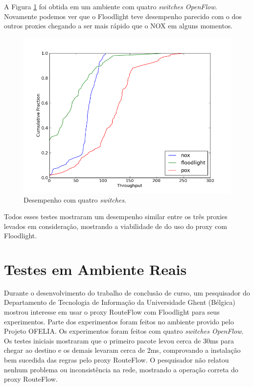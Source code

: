 A Figura \ref{fig:desempenho4sw} foi obtida em um ambiente
com quatro \textit{switches OpenFlow}. Novamente podemos
ver que o Floodlight teve desempenho parecido com o dos
outros proxies chegando a ser mais rápido que o NOX em 
alguns momentos.


\begin{figure}[h]
\centering
\includegraphics[width=140mm]{desempenho_4sw.png}
\caption{Desempenho com quatro \textit{switches}.}
\label{fig:desempenho4sw} 
\end{figure}

Todos esses testes mostraram um desempenho similar entre
os três proxies levados em consideração, mostrando a viabilidade
de do uso do proxy com Floodlight.

\section{Testes em Ambiente Reais}

Durante o desenvolvimento do trabalho de conclusão de
curso, um pesquisador do Departamento de Tecnologia de
Informação da Universidade Ghent (Bélgica) mostrou interesse
em usar o proxy RouteFlow com Floodlight para seus
experimentos. Parte dos experimentos foram feitos no ambiente
provido pelo Projeto OFELIA. Os experimentos
foram feitos com quatro \textit{switches OpenFlow}. Os testes
iniciais mostraram que o primeiro pacote levou cerca de 30ms
para chegar ao destino e os demais levaram cerca de
2ms, comprovando a instalação bem sucedida das regras pelo
proxy RouteFlow. O pesquisador não relatou nenhum 
problema ou inconsistência na rede, mostrando a operação
correta do proxy RouteFlow.



